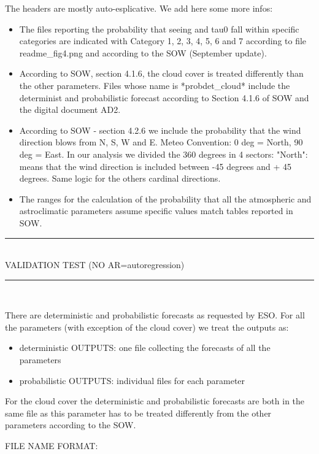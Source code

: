 \documentclass[11pt,english]{article}
\newcommand{\HRule}{\rule{\linewidth}{0.5mm}}
\begin{document}
The headers are mostly auto-esplicative.
%
We add here some more infos:
%
\begin{itemize}
\item  The files reporting the probability that seeing and tau0 fall within specific categories are indicated with Category 1, 2, 3, 4, 5, 6 and 7 according to file readme\_fig4.png and according to the SOW (September update).
\item According to SOW, section 4.1.6, the cloud cover is treated differently than the other parameters. Files whose name is *probdet\_cloud* include the determinist and probabilistic forecast according to Section 4.1.6 of SOW and the digital document AD2.
\item According to SOW - section 4.2.6 we include the probability that the wind direction blows from N, S, W and E. Meteo Convention: 0 deg = North, 90 deg = East. In our analysis we divided the 360 degrees in 4 sectors: "North": means that the wind direction is included between -45 degrees and + 45 degrees. Same logic for the others cardinal directions. 
\item  The ranges for the calculation of the probability that all the atmospheric and astroclimatic parameters assume specific values match tables reported in SOW.
\end{itemize}


\begin{center}
\HRule \\[0.4cm]
VALIDATION TEST (NO AR=autoregression)
\HRule \\[0.4cm]
\end{center}

There are deterministic and probabilistic forecasts as requested by ESO. For all the parameters (with exception of the cloud cover) we treat the outputs as:
\begin{itemize}
\item         deterministic OUTPUTS: one file collecting the forecasts of all the parameters 
             
\item probabilistic OUTPUTS: individual files for each parameter 
\end{itemize}


For the cloud cover the deterministic and probabilistic forecasts are both in the same file as this parameter has to be treated differently from the other parameters according to the SOW.


FILE NAME FORMAT:
\end{document}
